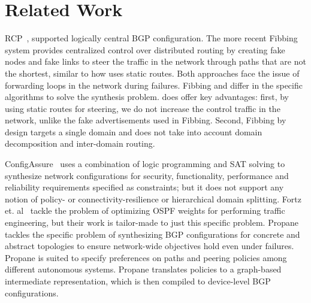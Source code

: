 \section{Related Work}\label{sec:related}
  RCP~\cite{rcp}, supported logically central BGP
configuration. The more recent Fibbing~\cite{fibbing} system provides
centralized control over distributed routing by creating fake nodes
and fake links to steer the traffic in the network through paths that
are not the shortest, similar to how \name uses static routes.  Both
approaches face the issue of forwarding loops in the network during
failures. Fibbing and \name differ in the specific algorithms to solve
the synthesis problem.  \name does offer key advantages: first, by
using static routes for steering, we do not increase the control traffic in
the network, unlike the fake advertisements used in Fibbing. Second,
Fibbing by design targets a single domain and does not take into account
domain decomposition and inter-domain routing. 



ConfigAssure~\cite{configassure}
uses a combination of logic programming and SAT solving to synthesize
network configurations for security, 
functionality, performance and
reliability requirements specified as constraints; 
but it does not
support any notion of policy- or connectivity-resilience 
or hierarchical domain splitting.  Fortz
et. al~\cite{ospf-te} tackle the problem of optimizing OSPF weights
for performing traffic engineering, but their work is tailor-made
to just this specific problem.
Propane~\cite{propane, propaneat} tackles the specific problem of
synthesizing BGP configurations for concrete and abstract topologies
to ensure network-wide objectives hold even under failures. 
Propane is suited to specify preferences on paths and
peering policies among different autonomous systems. Propane
translates policies to a graph-based intermediate representation,
which is then compiled to device-level BGP configurations. 


